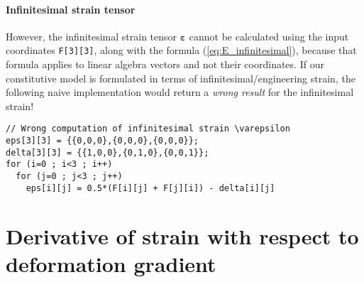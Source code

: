 \documentclass[letterpaper,12pt,oneside]{report}
\begin{document}
\paragraph{Infinitesimal strain tensor}
However, the infinitesimal strain tensor $\mathbf{\varepsilon}$ cannot be calculated using the input coordinates \texttt{F[3][3]}, along with the formula (\ref{eq:E_infinitesimal}), because that formula applies to linear algebra vectors and not their coordinates. If our constitutive model is formulated in terms of infinitesimal/engineering strain, the following naive implementation would return a \emph{wrong result} for the infinitesimal strain!
\begin{verbatim}
// Wrong computation of infinitesimal strain \varepsilon
eps[3][3] = {{0,0,0},{0,0,0},{0,0,0}};
delta[3][3] = {{1,0,0},{0,1,0},{0,0,1}};
for (i=0 ; i<3 ; i++)
  for (j=0 ; j<3 ; j++)
    eps[i][j] = 0.5*(F[i][j] + F[j][i]) - delta[i][j]
\end{verbatim}
























\section{Derivative of strain with respect to deformation gradient}
\end{document}
